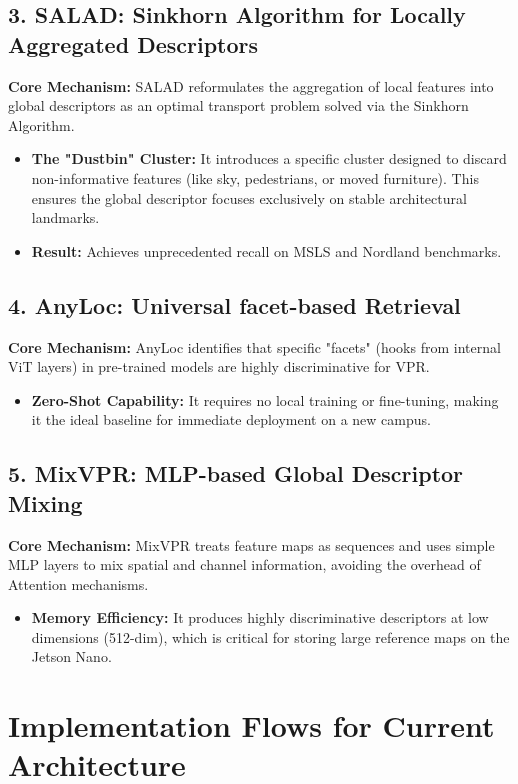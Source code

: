 \documentclass[11pt]{article}
\begin{document}
\subsection{3. SALAD: Sinkhorn Algorithm for Locally Aggregated Descriptors}
\textbf{Core Mechanism:} SALAD reformulates the aggregation of local features into global descriptors as an optimal transport problem solved via the Sinkhorn Algorithm.
\begin{itemize}
    \item \textbf{The "Dustbin" Cluster:} It introduces a specific cluster designed to discard non-informative features (like sky, pedestrians, or moved furniture). This ensures the global descriptor focuses exclusively on stable architectural landmarks.
    \item \textbf{Result:} Achieves unprecedented recall on MSLS and Nordland benchmarks.
\end{itemize}

\subsection{4. AnyLoc: Universal facet-based Retrieval}
\textbf{Core Mechanism:} AnyLoc identifies that specific "facets" (hooks from internal ViT layers) in pre-trained models are highly discriminative for VPR.
\begin{itemize}
    \item \textbf{Zero-Shot Capability:} It requires no local training or fine-tuning, making it the ideal baseline for immediate deployment on a new campus.
\end{itemize}

\subsection{5. MixVPR: MLP-based Global Descriptor Mixing}
\textbf{Core Mechanism:} MixVPR treats feature maps as sequences and uses simple MLP layers to mix spatial and channel information, avoiding the overhead of Attention mechanisms.
\begin{itemize}
    \item \textbf{Memory Efficiency:} It produces highly discriminative descriptors at low dimensions (512-dim), which is critical for storing large reference maps on the Jetson Nano.
\end{itemize}

\section{Implementation Flows for Current Architecture}
\end{document}
